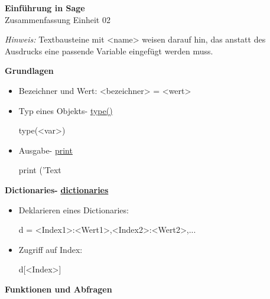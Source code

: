\documentclass[a4paper,9pt,DIV15,twocolumn]{scrartcl}
\begin{document}
\begin{center}
    \textbf{\LARGE Einführung in Sage}\\
    {\large Zusammenfassung Einheit 02}
\end{center}
\textsl{Hinweis:} Textbausteine mit <name> weisen darauf hin, das anstatt des Ausdrucks eine passende Variable eingefügt werden muss.

\medskip
\textbf{Grundlagen}
\begin{itemize}
    \item Bezeichner und Wert: <bezeichner> = <wert>
    \item Typ eines Objekts- \href{https://sage.math.uni-goettingen.de/doc/static/reference/sage/combinat/e_one_star.html#sage.combinat.e_one_star.Face.type}{type()}
        \begin{sagein}
type(<var>)    
        \end{sagein}
    \item Ausgabe- \href{http://docs.python.org/library/functions.html?highlight=print#print}{print} 
        \begin{sagein}
print ('Text %
        \end{sagein}
\end{itemize}



\textbf{Dictionaries- } \href{http://docs.python.org/library/stdtypes.html?highlight=.update#mapping-types-dict}{\textbf{dictionaries}}

\begin{itemize}
 \item Deklarieren eines Dictionaries:
\begin{sagein}
d = {<Index1>:<Wert1>,<Index2>:<Wert2>,...}
\end{sagein}
 \item Zugriff auf Index:
\begin{sagein}
d[<Index>]
\end{sagein}
\end{itemize}

\textbf{Funktionen und Abfragen}
\end{document}

